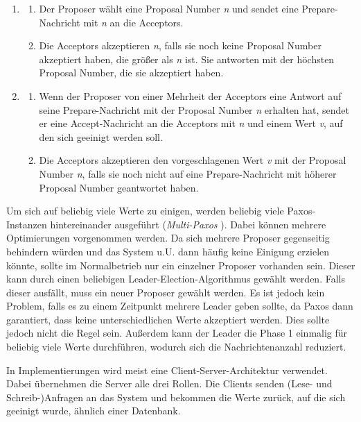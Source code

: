 \begin{enumerate}
	\item 
		\begin{enumerate}[label=\alph*)]
			\item Der Proposer wählt eine Proposal Number \textit{n} und sendet eine Prepare-Nachricht mit  \textit{n} an die Acceptors. 
			\item Die Acceptors akzeptieren \textit{n}, falls sie noch keine Proposal Number akzeptiert haben, die größer als \textit{n} ist. Sie antworten mit der höchsten Proposal Number, die sie akzeptiert haben.
		\end{enumerate}
	\item
		\begin{enumerate}[label=\alph*)]
		\item Wenn der Proposer von einer Mehrheit der Acceptors eine Antwort auf seine Prepare-Nachricht mit der Proposal Number \textit{n} erhalten hat, sendet er eine Accept-Nachricht an die Acceptors mit \textit{n} und einem Wert \textit{v}, auf den sich geeinigt werden soll.
		\item Die Acceptors akzeptieren den vorgeschlagenen Wert \textit{v} mit der Proposal Number \textit{n}, falls sie noch nicht auf eine Prepare-Nachricht mit höherer Proposal Number geantwortet haben.
	\end{enumerate}
\end{enumerate}

Um sich auf beliebig viele Werte zu einigen, werden beliebig viele Paxos-Instanzen hintereinander ausgeführt (\textit{Multi-Paxos} \cite{paxos-made-live}). Dabei können mehrere Optimierungen vorgenommen werden. Da sich mehrere Proposer gegenseitig behindern würden und das System u.U. dann häufig keine Einigung erzielen könnte, sollte im Normalbetrieb nur ein einzelner Proposer vorhanden sein. Dieser kann durch einen beliebigen Leader-Election-Algorithmus gewählt werden. Falls dieser ausfällt, muss ein neuer Proposer gewählt werden. Es ist jedoch kein Problem, falls es zu einem Zeitpunkt mehrere Leader geben sollte, da Paxos dann garantiert, dass keine unterschiedlichen Werte akzeptiert werden. Dies sollte jedoch nicht die Regel sein. Außerdem kann der Leader die Phase 1 einmalig für beliebig viele Werte durchführen, wodurch sich die Nachrichtenanzahl reduziert.

In Implementierungen wird meist eine Client-Server-Architektur verwendet. Dabei übernehmen die Server alle drei Rollen. Die Clients senden (Lese- und Schreib-)Anfragen an das System und bekommen die Werte zurück, auf die sich geeinigt wurde, ähnlich einer Datenbank.

